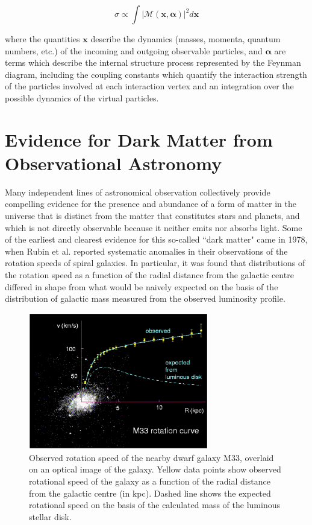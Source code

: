 \begin{equation}
\label{eq:matrix_element}
\sigma \propto \int|\mathcal{M(\boldsymbol{x}, \boldsymbol{\alpha})}|^2 d\boldsymbol{x} 
\end{equation}

\noindent where the quantities \(\boldsymbol{x}\) describe the dynamics (masses, momenta, quantum numbers, etc.) of the incoming and outgoing observable particles, and \(\boldsymbol{\alpha}\) are terms which describe the internal structure process represented by the Feynman diagram, including the coupling constants which quantify the interaction strength of the particles involved at each interaction vertex and an integration over the possible dynamics of the virtual particles. 


\section{Evidence for Dark Matter from Observational Astronomy}

Many independent lines of astronomical observation collectively provide compelling evidence for the presence and abundance of a form of matter in the universe that is distinct from the matter that constitutes stars and planets, and which is not directly observable because it neither emits nor absorbs light. Some of the earliest and clearest evidence for this so-called ``dark matter" came in 1978, when Rubin et al. \cite{Rubin_et_al} reported systematic anomalies in their observations of the rotation speeds of spiral galaxies. In particular, it was found that distributions of the rotation speed as a function of the radial distance from the galactic centre differed in shape from what would be naively expected on the basis of the distribution of galactic mass measured from the observed luminosity profile. 

\begin{figure}[H]
	\centering
	\includegraphics[width=0.7\textwidth]{Figures/1/m33_rotation.pdf}
	\caption[]{Observed rotation speed of the nearby dwarf galaxy M33, overlaid on an optical image of the galaxy. Yellow data points show observed rotational speed of the galaxy as a function of the radial distance from the galactic centre (in kpc). Dashed line shows the expected rotational speed on the basis of the calculated mass of the luminous stellar disk. }
	\label{fig:m33_rotation}
\end{figure}

